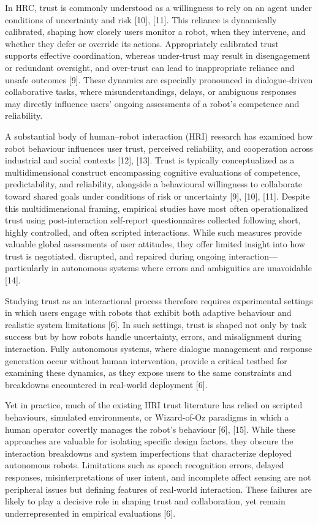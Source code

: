 \documentclass[
  letterpaper,
  DIV=11,
  numbers=noendperiod]{scrartcl}
\begin{document}
In HRC, trust is commonly understood as a willingness to rely on an
agent under conditions of uncertainty and risk {[}10{]}, {[}11{]}. This
reliance is dynamically calibrated, shaping how closely users monitor a
robot, when they intervene, and whether they defer or override its
actions. Appropriately calibrated trust supports effective coordination,
whereas under-trust may result in disengagement or redundant oversight,
and over-trust can lead to inappropriate reliance and unsafe outcomes
{[}9{]}. These dynamics are especially pronounced in dialogue-driven
collaborative tasks, where misunderstandings, delays, or ambiguous
responses may directly influence users' ongoing assessments of a robot's
competence and reliability.

A substantial body of human--robot interaction (HRI) research has
examined how robot behaviour influences user trust, perceived
reliability, and cooperation across industrial and social contexts
{[}12{]}, {[}13{]}. Trust is typically conceptualized as a
multidimensional construct encompassing cognitive evaluations of
competence, predictability, and reliability, alongside a behavioural
willingness to collaborate toward shared goals under conditions of risk
or uncertainty {[}9{]}, {[}10{]}, {[}11{]}. Despite this
multidimensional framing, empirical studies have most often
operationalized trust using post-interaction self-report questionnaires
collected following short, highly controlled, and often scripted
interactions. While such measures provide valuable global assessments of
user attitudes, they offer limited insight into how trust is negotiated,
disrupted, and repaired during ongoing interaction---particularly in
autonomous systems where errors and ambiguities are unavoidable
{[}14{]}.

Studying trust as an interactional process therefore requires
experimental settings in which users engage with robots that exhibit
both adaptive behaviour and realistic system limitations {[}6{]}. In
such settings, trust is shaped not only by task success but by how
robots handle uncertainty, errors, and misalignment during interaction.
Fully autonomous systems, where dialogue management and response
generation occur without human intervention, provide a critical testbed
for examining these dynamics, as they expose users to the same
constraints and breakdowns encountered in real-world deployment {[}6{]}.

Yet in practice, much of the existing HRI trust literature has relied on
scripted behaviours, simulated environments, or Wizard-of-Oz paradigms
in which a human operator covertly manages the robot's behaviour
{[}6{]}, {[}15{]}. While these approaches are valuable for isolating
specific design factors, they obscure the interaction breakdowns and
system imperfections that characterize deployed autonomous robots.
Limitations such as speech recognition errors, delayed responses,
misinterpretations of user intent, and incomplete affect sensing are not
peripheral issues but defining features of real-world interaction. These
failures are likely to play a decisive role in shaping trust and
collaboration, yet remain underrepresented in empirical evaluations
{[}6{]}.
\end{document}
